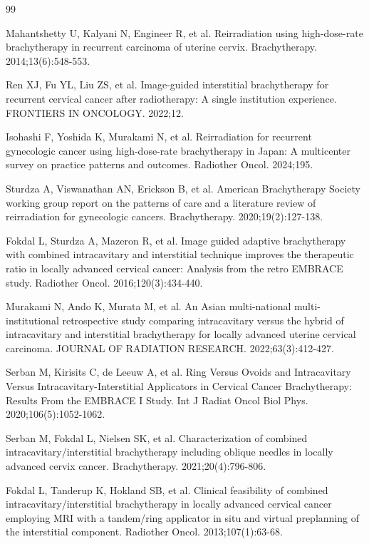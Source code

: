 \documentclass[12pt,twoside,letterpaper]{article}
\begin{document}
\begin{thebibliography}{99}

 Mahantshetty U, Kalyani N, Engineer R, et al. Reirradiation using high-dose-rate brachytherapy in recurrent carcinoma of uterine cervix. Brachytherapy. 2014;13(6):548-553.

 Ren XJ, Fu YL, Liu ZS, et al. Image-guided interstitial brachytherapy for recurrent cervical cancer after radiotherapy: A single institution experience. FRONTIERS IN ONCOLOGY. 2022;12.

 Isohashi F, Yoshida K, Murakami N, et al. Reirradiation for recurrent gynecologic cancer using high-dose-rate brachytherapy in Japan: A multicenter survey on practice patterns and outcomes. Radiother Oncol. 2024;195.

 Sturdza A, Viswanathan AN, Erickson B, et al. American Brachytherapy Society working group report on the patterns of care and a literature review of reirradiation for gynecologic cancers. Brachytherapy. 2020;19(2):127-138.

 Fokdal L, Sturdza A, Mazeron R, et al. Image guided adaptive brachytherapy with combined intracavitary and interstitial technique improves the therapeutic ratio in locally advanced cervical cancer: Analysis from the retro EMBRACE study. Radiother Oncol. 2016;120(3):434-440.

 Murakami N, Ando K, Murata M, et al. An Asian multi-national multi-institutional retrospective study comparing intracavitary versus the hybrid of intracavitary and interstitial brachytherapy for locally advanced uterine cervical carcinoma. JOURNAL OF RADIATION RESEARCH. 2022;63(3):412-427.

 Serban M, Kirisits C, de Leeuw A, et al. Ring Versus Ovoids and Intracavitary Versus Intracavitary-Interstitial Applicators in Cervical Cancer Brachytherapy: Results From the EMBRACE I Study. Int J Radiat Oncol Biol Phys. 2020;106(5):1052-1062.

 Serban M, Fokdal L, Nielsen SK, et al. Characterization of combined intracavitary/interstitial brachytherapy including oblique needles in locally advanced cervix cancer. Brachytherapy. 2021;20(4):796-806.

 Fokdal L, Tanderup K, Hokland SB, et al. Clinical feasibility of combined intracavitary/interstitial brachytherapy in locally advanced cervical cancer employing MRI with a tandem/ring applicator in situ and virtual preplanning of the interstitial component. Radiother Oncol. 2013;107(1):63-68.


\end{thebibliography}
\end{document}
